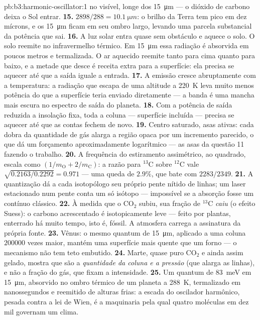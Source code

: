 \begin{solution}{pb:b3:harmonic-oscillator:1}
no visível, longe dos \qty{15}{\micro m} --- o dióxido de carbono deixa
o Sol entrar.
\textbf{15.} $2898/288 = \qty{10.1}{\micro m}$: o brilho da Terra tem
pico em dez mícrons, e os \qty{15}{\micro m} ficam em seu ombro largo,
levando uma parcela substancial da potência que sai.
\textbf{16.} A luz solar entra quase sem obstáculo e aquece o solo. O
solo reemite no infravermelho térmico. Em \qty{15}{\micro m} essa
radiação é absorvida em poucos metros e termalizada. O ar aquecido
reemite tanto para cima quanto para baixo, e a metade que desce é
receita extra para a superfície: ela precisa se aquecer até que a saída
iguale a entrada.
\textbf{17.} A emissão cresce abruptamente com a temperatura: a
radiação que escapa de uma altitude a \qty{220}{K} leva muito menos
potência do que a superfície teria enviado diretamente --- a banda é
uma mancha mais escura no espectro de saída do planeta.
\textbf{18.} Com a potência de saída reduzida a insolação fixa, toda a
coluna --- superfície incluída --- precisa se aquecer até que as contas
fechem de novo.
\textbf{19.} Centro saturado, asas ativas: cada dobra da quantidade de
gás alarga a região opaca por um incremento parecido, o que dá um
forçamento aproximadamente logarítmico --- as asas da questão 11
fazendo o trabalho.
\textbf{20.} A frequência do estiramento assimétrico, ao quadrado,
escala como $(1/m_{
\text{O}} + 2/m_{\text{C}})$: a razão para $^{13}$C sobre $^{12}$C
vale $\sqrt{0.2163/0.2292} = 0.971$ --- uma queda de $2.9\%$, que bate
com $2283/2349$.
\textbf{21.} A quantização dá a cada isotopólogo seu próprio pente
nítido de linhas; um laser estacionado num pente conta um só isótopo
--- impossível se a absorção fosse um contínuo clássico.
\textbf{22.} À medida que o CO$_2$ subiu, sua fração de $^{13}$C
\emph{caiu} (o efeito Suess): o carbono acrescentado é isotopicamente
leve --- feito por plantas, enterrado há muito tempo, isto é, fóssil. A
atmosfera carrega a assinatura da própria fonte.
\textbf{23.} Vênus: o mesmo quantum de \qty{15}{\micro m}, aplicado a
uma coluna $200000$ vezes maior, mantém uma superfície mais quente que
um forno --- o mecanismo não tem teto embutido.
\textbf{24.} Marte, quase puro CO$_2$ e ainda assim gelado, mostra que
são a \emph{quantidade da coluna e a pressão} (que alarga as linhas), e
não a fração do gás, que fixam a intensidade.
\textbf{25.} Um quantum de \qty{83}{meV} em \qty{15}{\micro m},
absorvido no ombro térmico de um planeta a \qty{288}{K}, termalizado em
nanossegundos e reemitido de alturas frias: a escada do oscilador
harmônico, pesada contra a lei de Wien, é a maquinaria pela qual quatro
moléculas em dez mil governam um clima.
\end{solution}
